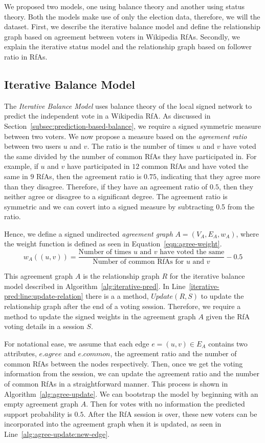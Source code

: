 We proposed two models, one using balance theory and another using status theory.
Both the models make use of only the election data, therefore, we will the \wikirfa dataset.
First, we describe the iterative balance model and define the relationship graph based on agreement between voters in Wikipedia RfAs.
Secondly, we explain the iterative status model and the relationship graph based on follower ratio in RfAs.

\subsection{Iterative Balance Model}
The \textit{Iterative Balance Model}  uses balance theory of the local signed network to predict the independent vote in a Wikipedia RfA.
As discussed in Section~\ref{subsec:prediction-based-balance}, we require a signed symmetric measure between two voters.
We now propose a measure based on the \textit{agreement ratio} between two users $u$ and $v$.
The ratio is the number of times $u$ and $v$ have voted the same divided by the number of common RfAs they have participated in.
For example, if $u$ and $v$ have participated in $12$ common RfAs and have voted the same in $9$ RfAs, then the agreement ratio is $0.75$, indicating that they agree more than they disagree.
Therefore, if they have an agreement ratio of $0.5$, then they neither agree or disagree to a significant degree.
The agreement ratio is symmetric and we can covert into a signed measure by subtracting 0.5 from the ratio.

Hence, we define a signed undirected \textit{agreement graph} $A= (V_{A},E_{A},w_{A})$, where the weight function is defined as seen in Equation~\eqref{eqn:agree-weight}.
\begin{equation}
    \label{eqn:agree-weight}
    w_{A}((u,v)) = \frac{\text{Number of times } u \text{ and } v \text{ have voted the same}}{\text{Number of common RfAs for } u \text{ and } v} -0.5
\end{equation}

This agreement graph $A$ is the relationship graph $R$ for the iterative balance model described in Algorithm~\ref{alg:iterative-pred}. 
In Line~\ref{iterative-pred:line:update-relation} there is a a method, $Update(R,S)$ to update the relationship graph after the end of a voting session.
Therefore, we require a method to update the signed weights in the agreement graph $A$ given the RfA voting details in a session $S$.

For notational ease, we assume that each edge $e = (u,v) \in E_{A}$ contains two attributes, $e.agree$ and $e.common$, the agreement ratio and the number of common RfAs between the nodes respectively.
Then, once we get the voting information from the session, we can update the agreement ratio and the number of common RfAs in a straightforward manner.
This process is shown in Algorithm~\ref{alg:agree-update}.
We can bootstrap the model by beginning with an empty agreement graph $A$.
Then for votes with no information the predicted support probability is $0.5$.
After the RfA session is over, these new voters can be incorporated into the agreement graph when it is updated, as seen in Line~\ref{alg:agree-update:new-edge}.

